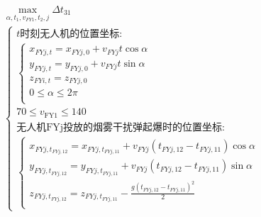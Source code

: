 \documentclass[../main.tex]{subfiles}
\begin{document}
\begin{align}
  \begin{array}{c}
	 \underset{\alpha ,t_1,v_{FY1},t_2,j}{\max}\Delta t_{31}
  \\
\left\{ \begin{array}{l}
	t\text{时刻无人机的位置坐标:}\\
	\left\{ \begin{array}{l}
x_{FYj,t} = x_{FYj,0} + v_{FYj} t \cos\alpha \\
y_{FYj,t} = y_{FYj,0} + v_{FYj} t \sin\alpha \\
z_{FYi,t} = z_{FYj,0}\\
0\leq \alpha \leq 2\pi \\
\end{array} \right.\\
  70 \leq v_{\text{FY1}} \leq 140\\
	\text{无人机FYj投放的烟雾干扰弹起爆时的位置坐标:}\\
	\left\{ \begin{array}{l}
	x_{FYj,t_{FYj,12}}=x_{FYj,t_{FYj,11}}+v_{FYj}\left( t_{FYj,12}-t_{FYj,11} \right) \cos \alpha\\
	y_{FYj,t_{FYj,12}}=y_{FYj,t_{FYj,11}}+v_{FYj}\left( t_{FYj,12}-t_{FYj,11} \right) \sin \alpha\\
	z_{FYj,t_{FYj,12}}=z_{FYj,t_{FYj,11}}-\frac{g\left( t_{FYj,12}-t_{FYj,11} \right) ^2}{2}\\
\end{array} \right. 
\end{array} \right.  
\end{array}
\end{align}


  
\end{document}
